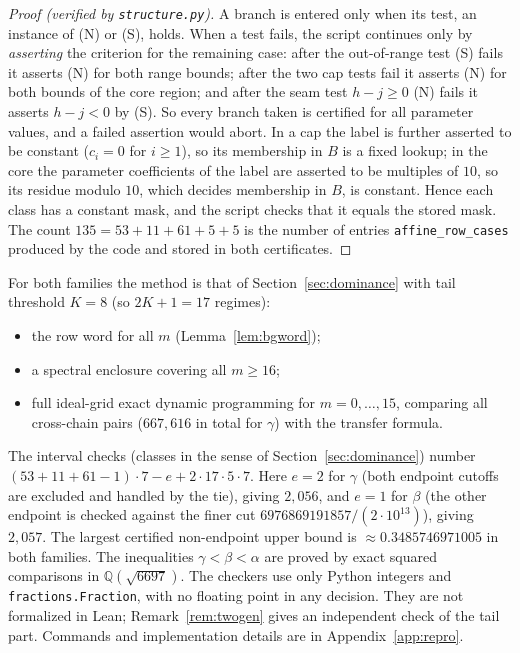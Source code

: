 \documentclass[11pt]{amsart}
\theoremstyle{definition}
\theoremstyle{remark}
\begin{document}
\begin{proof}[Proof (verified by \texttt{structure.py})]
A branch is entered only when its test, an instance of (N) or (S), holds. When a test fails, the script continues only by \emph{asserting} the criterion for the remaining case: after the out-of-range test (S) fails it asserts (N) for both range bounds; after the two cap tests fail it asserts (N) for both bounds of the core region; and after the seam test $h-j\ge0$ (N) fails it asserts $h-j<0$ by (S). So every branch taken is certified for all parameter values, and a failed assertion would abort. In a cap the label is further asserted to be constant ($c_i=0$ for $i\ge1$), so its membership in $B$ is a fixed lookup; in the core the parameter coefficients of the label are asserted to be multiples of $10$, so its residue modulo $10$, which decides membership in $B$, is constant. Hence each class has a constant mask, and the script checks that it equals the stored mask. The count $135=53+11+61+5+5$ is the number of entries \texttt{affine\_row\_cases} produced by the code and stored in both certificates.
\end{proof}

For both families the method is that of Section~\ref{sec:dominance} with tail threshold $K=8$ (so $2K+1=17$ regimes):
\begin{itemize}
  \item the row word for all $m$ (Lemma~\ref{lem:bgword});
  \item a spectral enclosure covering all $m\ge16$;
  \item full ideal-grid exact dynamic programming for $m=0,\dots,15$, comparing all cross-chain pairs ($667{,}616$ in total for $\gamma$) with the transfer formula.
\end{itemize}
The interval checks (classes in the sense of Section~\ref{sec:dominance}) number $(53+11+61-1)\cdot7-e+2\cdot17\cdot5\cdot7$. Here $e=2$ for $\gamma$ (both endpoint cutoffs are excluded and handled by the tie), giving $2{,}056$, and $e=1$ for $\beta$ (the other endpoint is checked against the finer cut $6976869191857/(2\cdot10^{13})$), giving $2{,}057$. The largest certified non-endpoint upper bound is $\approx0.3485746971005$ in both families. The inequalities $\gamma<\beta<\alpha$ are proved by exact squared comparisons in $\mathbb{Q}(\sqrt{6697})$. The checkers use only Python integers and \texttt{fractions.Fraction}, with no floating point in any decision. They are not formalized in Lean; Remark~\ref{rem:twogen} gives an independent check of the tail part. Commands and implementation details are in Appendix~\ref{app:repro}.
\end{document}
